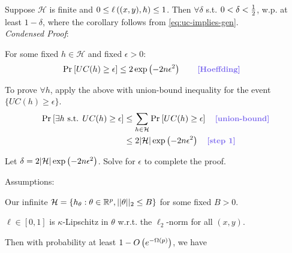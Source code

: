 \documentclass[11pt]{article}
\begin{document}
\begin{definition}
	Suppose $\mathcal H$ is finite and $0 \leq \ell\left(  (x, y), h  \right) \leq 1$. Then $\forall \delta$ s.t. $0< \delta < \frac{1}{2}$, w.p. at least $1-\delta$,
	where the corollary follows from \ref{eq:uc-implies-gen}. \\
	
	\textit{Condensed Proof}: 
	\begin{compactenum}
		\item For some fixed $h \in \mathcal H$ and fixed $\epsilon > 0$:
		\begin{align}
			\Prob{UC(h)  \geq \epsilon } 
			&\leq 2 \exp\lr{ -2 n \epsilon^2 } \qquad \mtblue{[Hoeffding]}
		\end{align}
	
		\item To prove $\forall h$, apply the above with union-bound inequality for the event  $\{ UC(h) \geq \epsilon \}$. 
		\begin{align}
			\Prob{ \exists h \text{ s.t. } UC(h) \geq \epsilon }
				&\leq \sum_{h \in \mathcal H} \Prob{ UC(h) \geq \epsilon } \quad \mtblue{[union-bound]} \\
				&\leq 2 |\mathcal H| \exp\lr{ -2n\epsilon^2 } \quad \mtblue{[step 1]}
		\end{align}
	
		\item Let $\delta =  2 |\mathcal H| \exp\left(  -2n\epsilon^2  \right) $. Solve for $\epsilon$ to complete the proof.
	\end{compactenum}
\end{definition}

\begin{definition}
	Assumptions: 
	\begin{compactitem}
		\item Our infinite $\mathcal H = \{h_{\theta} : \theta \in \mathbb{R}^p, ||\theta||_2 \leq B \}$ for some fixed $B > 0$. 
		\item $\ell \in [0, 1]$ is $\kappa$-Lipschitz in $\theta$ w.r.t. the $\ell_2$-norm for all $(x, y)$. 
	\end{compactitem}

	Then with probability at least $1 - O\left(   e^{  -\Omega(p) }   \right)$, we have
	
\end{definition}
\end{document}
